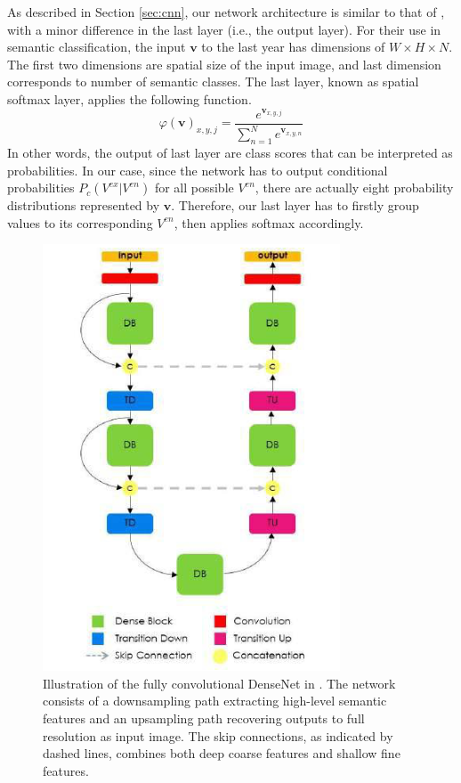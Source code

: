 As described in Section \ref{sec:cnn}, our network architecture is similar to that of \citet{jegou2017one}, with a minor difference in the last layer (i.e., the output layer). For their use in semantic classification, the input $\mathbf{v}$ to the last year has dimensions of $W\times H \times N$. The first two dimensions are spatial size of the input image, and last dimension corresponds to number of semantic classes. The last layer, known as spatial softmax layer, applies the following function.
\[\varphi(\mathbf{v})_{x, y, j} = \frac{e^{\mathbf{v}_{x, y, j}}}{\sum_{n=1}^N e^{\mathbf{v}_{x, y, n}}}\]
In other words, the output of last layer are class scores that can be interpreted as probabilities. In our case, since the network has to output conditional probabilities $P_c({V^{ex}|V^{en}})$ for all possible $V^{en}$, there are actually eight probability distributions represented by $\mathbf{v}$. Therefore, our last layer has to firstly group values to its corresponding $V^{en}$, then applies softmax accordingly. 

\begin{figure}[H]
  \centering
    \includegraphics[width=.45\textwidth]{figures/tiramisu.png}
    \caption[Illustration of the fully convolutional DenseNet.]{Illustration of the fully convolutional DenseNet in \citep{jegou2017one}. The network consists of a downsampling path extracting high-level semantic features and an upsampling path recovering outputs to full resolution as input image. The skip connections, as indicated by dashed lines, combines both deep coarse features and shallow fine features.}
    \label{fig:tiramisu}
\end{figure}


